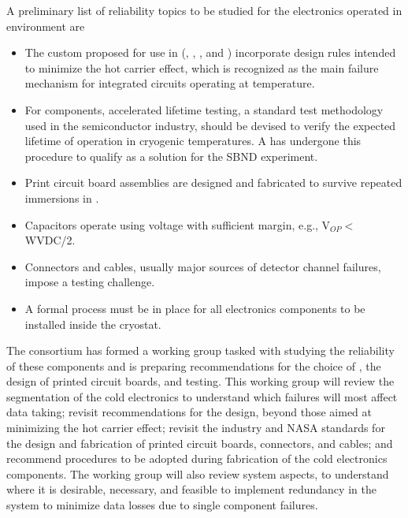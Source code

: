 A preliminary list of reliability topics to be studied for the  electronics operated 
in  environment are
\begin{itemize}
	\item The custom  proposed for use in  (, 
	, , and ) incorporate design rules 
	intended to minimize the hot carrier effect\cite{Li:CELAr,Hoff:2015hax}, 
	which is recognized as the main failure mechanism for integrated circuits 
	operating at  temperature.
	\item For  components, accelerated lifetime testing, a standard test 
	methodology used in the semiconductor industry, should be devised to verify 
	the expected lifetime of operation in cryogenic temperatures. A   has 
	undergone this procedure to qualify as a solution for the SBND 
	experiment\cite{Chen:2018zic}.
	\item Print circuit board assemblies are designed and fabricated to survive 
	repeated immersions in \lntwo.
	\item Capacitors operate using voltage with sufficient margin, e.g., V$_{OP}<$ WVDC/2.
	\item Connectors and cables, usually major sources of detector channel 
	failures, impose a testing challenge.
        \item A formal  process must be in place for all  electronics components to be installed inside the cryostat.
\end{itemize}
The  consortium has formed a working group tasked with studying the reliability  
of these components and is preparing recommendations for the choice of , 
the design of printed circuit boards, and testing. This working group will review the 
segmentation of the cold electronics to understand which failures will most affect data taking; revisit recommendations for the  design, 
beyond those aimed at minimizing the hot carrier effect; revisit the industry and 
NASA standards for the design and fabrication of printed circuit boards, connectors, 
and cables; and recommend  procedures to be adopted during 
fabrication of the cold electronics components. The working group will also review
system aspects, to understand where it is desirable, necessary, and feasible to implement 
redundancy in the system to minimize data losses due to single component failures. 
